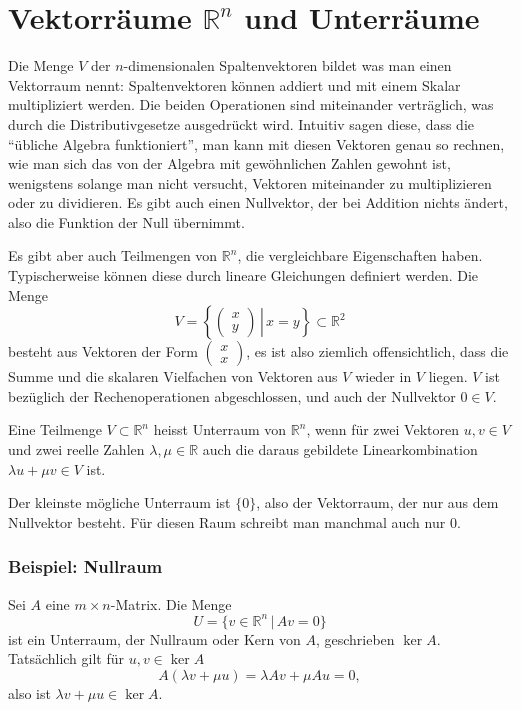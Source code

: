 %
%
%

\section{Vektorräume \texorpdfstring{$\mathbb R^n$}{R hoch n} und Unterräume}
Die Menge $V$ der $n$-dimensionalen Spaltenvektoren bildet was man
einen Vektorraum nennt: Spaltenvektoren können addiert und mit
einem Skalar multipliziert werden.
Die beiden Operationen sind
miteinander verträglich, was durch die Distributivgesetze ausgedrückt
wird.
Intuitiv sagen diese, dass die ``übliche Algebra funktioniert'',
man kann mit diesen Vektoren genau so rechnen, wie man sich das von
der Algebra mit gewöhnlichen Zahlen gewohnt ist, wenigstens solange
man nicht versucht, Vektoren miteinander zu multiplizieren oder zu
dividieren.
Es gibt auch einen Nullvektor, der bei Addition nichts ändert,
also die Funktion der Null übernimmt.

Es gibt aber auch Teilmengen von $\mathbb R^n$, die vergleichbare
Eigenschaften haben.
Typischerweise können diese durch lineare Gleichungen definiert werden.
Die Menge
\[
V=\left\{\left.\begin{pmatrix}x\\y\end{pmatrix}\,\right|\,x=y\right\}
\subset\mathbb R^2
\]
besteht aus Vektoren der Form $\begin{pmatrix}x\\x\end{pmatrix}$,
es ist also ziemlich offensichtlich, dass die Summe und die skalaren
Vielfachen von  Vektoren aus $V$ wieder in $V$ liegen.
$V$ ist
bezüglich der Rechenoperationen abgeschlossen, und auch der Nullvektor
$0\in V$.

\begin{definition}
Eine Teilmenge $V\subset\mathbb R^n$ heisst Unterraum von $\mathbb R^n$,
wenn für zwei Vektoren
$u,v\in V$ und zwei reelle Zahlen $\lambda,\mu\in\mathbb R$
auch die daraus gebildete Linearkombination
$\lambda u+\mu v\in V$ ist.
\end{definition}

Der kleinste mögliche Unterraum ist $\{0\}$, also der Vektorraum, der nur aus
dem Nullvektor besteht.
Für diesen Raum schreibt man manchmal auch nur $0$.

\subsubsection{Beispiel: Nullraum}
Sei $A$ eine $m\times n$-Matrix.
Die Menge
\[
U=\{v\in\mathbb R^n\,|\,Av=0\}
\]
ist ein Unterraum, der Nullraum oder Kern von $A$, geschrieben
$\operatorname{ker}A$.
Tatsächlich gilt für $u,v\in\operatorname{ker}A$
\[
A(\lambda v+\mu u)=\lambda Av+\mu Au=0,
\]
also ist $\lambda v+\mu u\in\operatorname{ker}A$.

